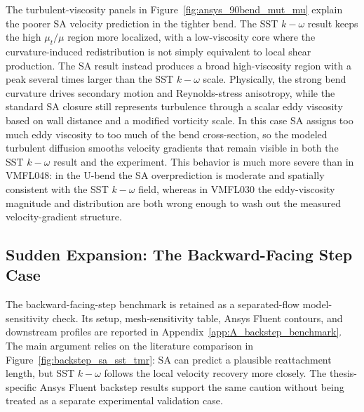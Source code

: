 The turbulent-viscosity panels in Figure~\ref{fig:ansys_90bend_mut_mu} explain the poorer SA velocity prediction in the tighter bend. The SST $k-\omega$ result keeps the high $\mu_t/\mu$ region more localized, with a low-viscosity core where the curvature-induced redistribution is not simply equivalent to local shear production. The SA result instead produces a broad high-viscosity region with a peak several times larger than the SST $k-\omega$ scale. Physically, the strong bend curvature drives secondary motion and Reynolds-stress anisotropy, while the standard SA closure still represents turbulence through a scalar eddy viscosity based on wall distance and a modified vorticity scale. In this case SA assigns too much eddy viscosity to too much of the bend cross-section, so the modeled turbulent diffusion smooths velocity gradients that remain visible in both the SST $k-\omega$ result and the experiment. This behavior is much more severe than in VMFL048: in the U-bend the SA overprediction is moderate and spatially consistent with the SST $k-\omega$ field, whereas in VMFL030 the eddy-viscosity magnitude and distribution are both wrong enough to wash out the measured velocity-gradient structure.

\subsection{Sudden Expansion: The Backward-Facing Step Case}
The backward-facing-step benchmark is retained as a separated-flow model-sensitivity check. Its setup, mesh-sensitivity table, Ansys Fluent contours, and downstream profiles are reported in Appendix~\ref{app:A_backstep_benchmark}. The main argument relies on the literature comparison in Figure~\ref{fig:backstep_sa_sst_tmr}: SA can predict a plausible reattachment length, but SST $k-\omega$ follows the local velocity recovery more closely. The thesis-specific Ansys Fluent backstep results support the same caution without being treated as a separate experimental validation case.

